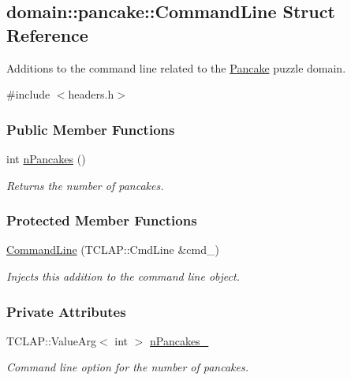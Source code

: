 \hypertarget{structdomain_1_1pancake_1_1CommandLine}{}\subsection{domain\+:\+:pancake\+:\+:Command\+Line Struct Reference}
\label{structdomain_1_1pancake_1_1CommandLine}


Additions to the command line related to the \hyperlink{structdomain_1_1pancake_1_1Pancake}{Pancake} puzzle domain.  




{\ttfamily \#include $<$headers.\+h$>$}

\subsubsection*{Public Member Functions}
\begin{DoxyCompactItemize}
\item 
int \hyperlink{structdomain_1_1pancake_1_1CommandLine_a255ab41a6d4dac2cd8119252b396e7f9}{n\+Pancakes} ()
\begin{DoxyCompactList}\small\item\em Returns the number of pancakes. \end{DoxyCompactList}\end{DoxyCompactItemize}
\subsubsection*{Protected Member Functions}
\begin{DoxyCompactItemize}
\item 
\hyperlink{structdomain_1_1pancake_1_1CommandLine_a90c646ddcaa76704252b32201b077e2c}{Command\+Line} (T\+C\+L\+A\+P\+::\+Cmd\+Line \&cmd\+\_\+)
\begin{DoxyCompactList}\small\item\em Injects this addition to the command line object. \end{DoxyCompactList}\end{DoxyCompactItemize}
\subsubsection*{Private Attributes}
\begin{DoxyCompactItemize}
\item 
T\+C\+L\+A\+P\+::\+Value\+Arg$<$ int $>$ \hyperlink{structdomain_1_1pancake_1_1CommandLine_adece8888495664a8941db15025b9fcb8}{n\+Pancakes\+\_\+}\hypertarget{structdomain_1_1pancake_1_1CommandLine_adece8888495664a8941db15025b9fcb8}{}\label{structdomain_1_1pancake_1_1CommandLine_adece8888495664a8941db15025b9fcb8}

\begin{DoxyCompactList}\small\item\em Command line option for the number of pancakes. \end{DoxyCompactList}\end{DoxyCompactItemize}


